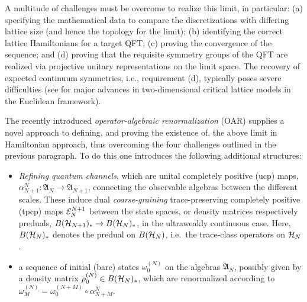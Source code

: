 \documentclass[a4paper, 11pt]{article}
\newcommand{\fA}{\mathfrak{A}}\newcommand{\cA}{\mathcal{A}}\newcommand{\dA}{\mathds{A}}\newcommand{\sA}{\mathscr{A}}
\DeclareMathOperator{\1}{\mathds{1}}
\begin{document}
A multitude of challenges must be overcome to realize this limit, in particular: (a) specifying the mathematical data to compare the discretizations with differing lattice size (and hence the topology for the limit); (b) identifying the correct lattice Hamiltonians for a target QFT; (c) proving the convergence of the sequence; and (d) proving that the requisite symmetry groups of the QFT are realized via projective unitary representations on the limit space. The recovery of expected continuum symmetries, i.e., requirement (d), typically poses severe difficulties (see \cite{SmirnovTowardsConformalInvariance, ChelkakUniversalityInThe, HonglerConformalFieldTheory, DuminilCopinRotationalInvarianceIn} for major advances in two-dimensional critical lattice models in the Euclidean framework).

The recently introduced \emph{operator-algebraic renormalization} (OAR) \cite{StottmeisterOperatorAlgebraicRenormalization, MorinelliScalingLimitsOf, BrothierConstructionsOfConformal} supplies a novel approach to defining, and proving the existence of, the above limit in Hamiltonian approach, thus overcoming the four challenges outlined in the previous paragraph. To do this one introduces the following additional structures:
\begin{itemize}
	\item \emph{Refining quantum channels}, which are unital completely positive (ucp) maps, $\alpha^{N}_{N+1}:\fA_{N}\rightarrow\fA_{N+1}$, connecting the observable algebras between the different scales. These induce dual \emph{coarse-graining} trace-preserving completely positive (tpcp) maps $\mathcal{E}^{N+1}_{N}$ between the state spaces, or density matrices respectively preduals, $B(\mathcal{H}_{N+1})_{*}\rightarrow B(\mathcal{H}_{N})_{*}$, in the ultraweakly continuous case. Here, $B(\mathcal{H}_{N})_{*}$ denotes the predual on $B(\mathcal{H}_{N})$, i.e.~the trace-class operators on $\mathcal{H}_{N}$.
	\item a sequence of initial (bare) states $\omega^{(N)}_{0}$ on the algebras $\mathfrak{A}_N$, possibly given by a density matrix $\rho^{(N)}_{0}\in B(\mathcal{H}_{N})_{*}$, which are renormalized according to $\omega^{(N)}_{M} = \omega^{(N+M)}_{0}\circ\alpha^{N}_{N+M}$.
\end{itemize}
\end{document}
